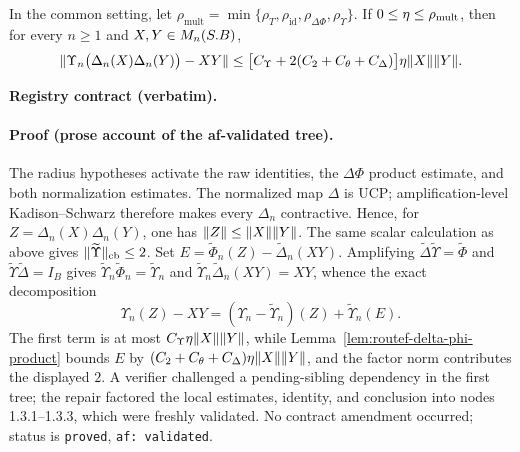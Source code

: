 \begin{lemma}\label{lem:routef-multiplicative-telescope}
In the common setting, let
$\rho_{\mathrm{mult}}=\min\{\rho_T,\rho_{\mathrm{id}},
\rho_{\Delta\Phi},\rho_{\Upsilon}\}$. If $0\le\eta\le\rho_{\mathrm{mult}}$, then
for every $n\ge1$ and $X,Y\in M_{n}(S.B)$,
\[
 \lVert \Upsilon_n\bigl(\Delta_n(X)\Delta_n(Y)\bigr)-XY\rVert
 \le\bigl[C_{\Upsilon}+2(C_2+C_{\theta}+C_{\Delta})\bigr]
 \eta\lVert X\rVert\lVert Y\rVert.
\]
\end{lemma}
\noindent\textbf{Registry contract (verbatim).} 
\paragraph{Proof (prose account of the af-validated tree).}
The radius hypotheses activate the raw identities, the $\Delta\Phi$ product estimate, and
both normalization estimates. The normalized map $\Delta$ is UCP; amplification-level
Kadison--Schwarz therefore makes every $\Delta_n$ contractive. Hence, for
$Z=\Delta_n(X)\Delta_n(Y)$, one has $\lVert Z\rVert\le\lVert X\rVert\lVert Y\rVert$. The same scalar
calculation as above gives $\lVert \widetilde\Upsilon\rVert_{\mathrm{cb}}\le2$. Set
$E=\widetilde\Phi_n(Z)-\widetilde\Delta_n(XY)$. Amplifying
$\widetilde\Delta\widetilde\Upsilon=\widetilde\Phi$ and
$\widetilde\Upsilon\widetilde\Delta=I_B$ gives
$\widetilde\Upsilon_n\widetilde\Phi_n=\widetilde\Upsilon_n$ and
$\widetilde\Upsilon_n\widetilde\Delta_n(XY)=XY$, whence the exact decomposition
\[
 \Upsilon_n(Z)-XY=(\Upsilon_n-\widetilde\Upsilon_n)(Z)
 +\widetilde\Upsilon_n(E).
\]
The first term is at most $C_{\Upsilon}\eta\lVert X\rVert\lVert Y\rVert$, while
Lemma~\ref{lem:routef-delta-phi-product} bounds $E$ by
$(C_2+C_{\theta}+C_{\Delta})\eta\lVert X\rVert\lVert Y\rVert$, and the factor norm contributes
the displayed $2$. A verifier challenged a pending-sibling dependency in the first tree;
the repair factored the local estimates, identity, and conclusion into nodes 1.3.1--1.3.3,
which were freshly validated. No contract amendment occurred; status is
\texttt{proved}, \texttt{af: validated}.

